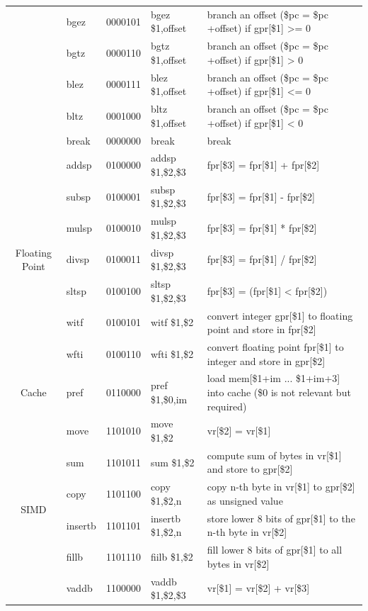 \documentclass{sig-alternate}
\begin{document}
\begin{table}[p]
\begin{tabular}{|c|l|c|l|p{8cm}|}
 & bgez & 0000101 & bgez \$1,offset & branch an offset (\$pc = \$pc +offset) if gpr[\$1] >= 0 \\ \cline{2-5}
 & bgtz & 0000110 & bgtz \$1,offset & branch an offset (\$pc = \$pc +offset) if gpr[\$1] > 0 \\ \cline{2-5}
 & blez & 0000111 & blez \$1,offset &  branch an offset (\$pc = \$pc +offset) if gpr[\$1] <= 0 \\ \cline{2-5}  
 & bltz & 0001000 & bltz \$1,offset & branch an offset (\$pc = \$pc +offset) if gpr[\$1] < 0 \\ \cline{2-5}
 & break & 0000000 & break & break \\ \hline
 \multirow{7}{*}{Floating Point} & addsp & 0100000 & addsp \$1,\$2,\$3 & fpr[\$3] = fpr[\$1] + fpr[\$2] \\ \cline{2-5}
 & subsp & 0100001 & subsp \$1,\$2,\$3 & fpr[\$3] = fpr[\$1] - fpr[\$2] \\ \cline{2-5}  
 & mulsp & 0100010 & mulsp \$1,\$2,\$3 & fpr[\$3] = fpr[\$1] * fpr[\$2] \\ \cline{2-5}
 & divsp & 0100011 & divsp \$1,\$2,\$3 & fpr[\$3] = fpr[\$1] / fpr[\$2] \\ \cline{2-5}
 & sltsp & 0100100 & sltsp \$1,\$2,\$3 & fpr[\$3] = (fpr[\$1] < fpr[\$2])\\ \cline{2-5}
 & witf & 0100101 & witf \$1,\$2 & convert integer gpr[\$1] to floating point and store in fpr[\$2] \\ \cline{2-5}
 & wfti & 0100110 & wfti \$1,\$2 & convert floating point fpr[\$1] to integer and store in gpr[\$2]\\ \hline
 Cache & pref & 0110000 & pref \$1,\$0,im & load mem[\$1+im ... \$1+im+3] into cache (\$0 is not relevant but required) \\ \hline
 \multirow{15}{*}{SIMD} & move & 1101010 & move \$1,\$2 & vr[\$2] = vr[\$1] \\ \cline{2-5}
 & sum & 1101011 & sum \$1,\$2 & compute sum of bytes in vr[\$1] and store to gpr[\$2] \\ \cline{2-5}  
 & copy & 1101100 & copy \$1,\$2,n & copy n-th byte in vr[\$1] to gpr[\$2] as unsigned value\\ \cline{2-5}
 & insertb & 1101101 & insertb \$1,\$2,n & store lower 8 bits of gpr[\$1] to the n-th byte in vr[\$2] \\ \cline{2-5}
 & fillb & 1101110 & fiilb \$1,\$2 & fill lower 8 bits of gpr[\$1] to all bytes in vr[\$2] \\ \cline{2-5}
 & vaddb & 1100000 & vaddb \$1,\$2,\$3 & vr[\$1] = vr[\$2] + vr[\$3] \\ \cline{2-5}

\end{tabular}
\end{table}
\end{document}
